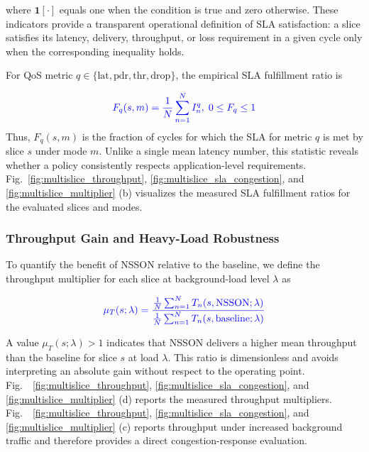 \documentclass[journal]{IEEEtran}
\newcommand{\revblue}[1]{\textcolor{revblue}{#1}}
\begin{document}
\revblue{where $\mathbf{1}[\cdot]$ equals one when the condition is true
and zero otherwise. These indicators provide a transparent operational
definition of SLA satisfaction: a slice satisfies its latency, delivery,
throughput, or loss requirement in a given cycle only when the
corresponding inequality holds.}

\revblue{For QoS metric $q\in\{\mathrm{lat},\mathrm{pdr},
\mathrm{thr},\mathrm{drop}\}$, the empirical SLA fulfillment ratio is}

\begin{equation}
\color{blue}
F_q(s,m)=\frac{1}{N}\sum_{n=1}^{N} I^q_n,
\; 0\leq F_q\leq 1
\label{eq:multislice_sla_fulfillment}
\end{equation}
\revblue{Thus, $F_q(s,m)$ is the fraction of cycles for which the SLA for
metric $q$ is met by slice $s$ under mode $m$. Unlike a single mean
latency number, this statistic reveals whether a policy consistently
respects application-level requirements. Fig.~\ref{fig:multislice_throughput}, \ref{fig:multislice_sla_congestion}, and \ref{fig:multislice_multiplier}
(b) visualizes the measured SLA fulfillment ratios for the evaluated
slices and modes.}

\subsubsection{\revblue{Throughput Gain and Heavy-Load Robustness}}

\revblue{To quantify the benefit of NSSON relative to the baseline, we
define the throughput multiplier for each slice at background-load level
$\lambda$ as}

\begin{equation}
\color{blue}
\mu_T(s;\lambda)=
\frac{\frac{1}{N}\sum_{n=1}^{N}T_n(s,\mathrm{NSSON};\lambda)}
{\frac{1}{N}\sum_{n=1}^{N}T_n(s,\mathrm{baseline};\lambda)}
\label{eq:multislice_throughput_multiplier}
\end{equation}

\revblue{A value $\mu_T(s;\lambda)>1$ indicates that NSSON delivers a
higher mean throughput than the baseline for slice $s$ at load
$\lambda$. This ratio is dimensionless and avoids interpreting an
absolute gain without respect to the operating point. Fig.~~\ref{fig:multislice_throughput}, \ref{fig:multislice_sla_congestion}, and \ref{fig:multislice_multiplier}
(d) reports the measured throughput multipliers. Fig.~~\ref{fig:multislice_throughput}, \ref{fig:multislice_sla_congestion}, and \ref{fig:multislice_multiplier}
(c) reports throughput under increased background traffic and therefore
provides a direct congestion-response evaluation.}
\end{document}
